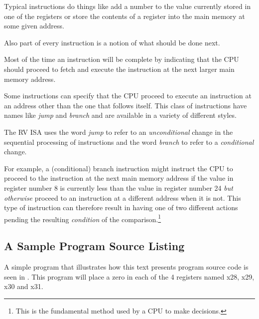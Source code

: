 Typical instructions do things like add a number to the value
currently stored in one of the registers or store the contents of a
register into the main memory at some given address.

Also part of every instruction is a notion of what should be done next.

Most of the time an instruction will be complete by indicating that
the CPU should proceed to fetch and execute the instruction at the next
larger main memory address.

Some instructions can specify that the CPU proceed to execute an
instruction at an address other than the one that follows itself.
This class of instructions have names like {\em jump} and {\em branch}
and are available in a variety of different styles.

The RV ISA uses the word {\em jump} to refer to an {\em unconditional}
change in the sequential processing of instructions and the word
{\em branch} to refer to a {\em conditional} change.

For example, a (conditional) branch instruction might instruct the CPU 
to proceed to the instruction at the next main memory address if the value 
in register number 8 is currently less than the value in register number 
24 {\em but otherwise} proceed to an instruction at a different address
when it is not.  This type of instruction can therefore result in having 
one of two different actions pending the resulting {\em condition} of 
the comparison.\footnote{This is the fundamental method used by a CPU 
to make decisions.}


\subsection{A Sample Program Source Listing}

A simple program that illustrates how this text presents 
program source code is seen in .
This program will place a zero in each of the 4 registers 
named x28, x29, x30 and x31.


